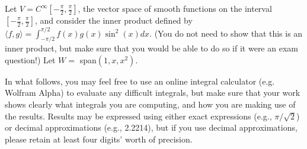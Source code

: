 \documentclass[12pt]{exam}
\begin{document}
\begin{questions}
\question Let $V = C^\infty \left[ -\frac{\pi}{2}, \frac{\pi}{2}\right]$, the vector space of smooth functions on the interval $\left[ -\frac{\pi}{2}, \frac{\pi}{2}\right]$, and consider the inner product defined by $\langle f, g\rangle = \int_{-\pi/2}^{\pi/2} f (x)g(x) \sin^2(x) dx$. (You do not need to show that this is an inner product, but make sure that you would be able to do so if it were an exam question!) Let $W = $ span$(1, x, x^2)$.
\par In what follows, you may feel free to use an online integral calculator (e.g. Wolfram Alpha) to evaluate any difficult integrals, but make sure that your work shows clearly what integrals you are computing, and how you are making use of the results. Results may be expressed using either exact expressions (e.g., $\pi/\sqrt2$) or decimal approximations (e.g., 2.2214), but if you use decimal approximations, please retain at least four digits' worth of precision.
    \begin{parts}

\end{parts}
\end{questions}
\end{document}
